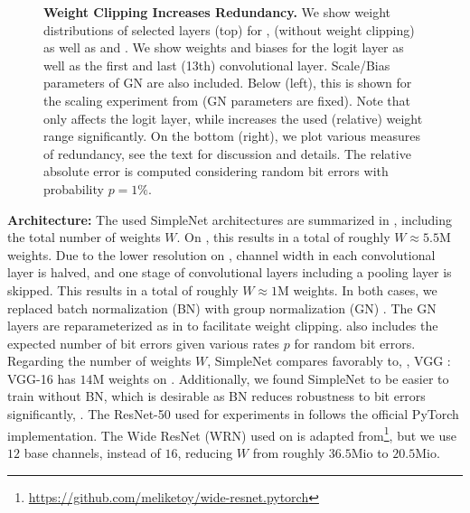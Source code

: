\begin{figure}[t]
\begin{subfigure}{0.35\textwidth}
	\end{subfigure}
	\vspace*{-6px}
	\caption{\textbf{Weight Clipping Increases Redundancy.} We show weight distributions of selected layers (top) for \Quant, \Random (without weight clipping) as well as \Clipping[$0.1$] and \Clipping[$0.05$]. We show weights and biases for the logit layer as well as the first and last (13th) convolutional layer. Scale/Bias parameters of GN are also included. Below (left), this is shown for the scaling experiment from  (GN parameters are fixed). Note that \Random only affects the logit layer, while \Clipping increases the used (relative) weight range significantly. On the bottom (right), we plot various measures of redundancy, see the text for discussion and details. The relative absolute error is computed considering random bit errors with probability $p = 1\%$.}
	\label{fig:supp-clipping}
	\vspace*{-0.1cm}
\end{figure}

\textbf{Architecture:} The used SimpleNet architectures \cite{HasanpourARXIV2016} are summarized in , including the total number of weights $W$. On \Cifar, this results in a total of roughly $W \approx 5.5\text{M}$ weights. Due to the lower resolution on \MNIST, channel width in each convolutional layer is halved, and one stage of convolutional layers including a pooling layer is skipped. This results in a total of roughly $W \approx 1\text{M}$ weights. In both cases, we replaced batch normalization (BN) \cite{IoffeICML2015} with group normalization (GN) \cite{WuECCV2018}. The GN layers are reparameterized as in  to facilitate weight clipping.  also includes the expected number of bit errors given various rates $p$ for random bit errors. Regarding the number of weights $W$, SimpleNet compares favorably to, \eg, VGG \cite{SimonyanICLR2015}: VGG-16 has $14\text{M}$ weights on \Cifar. Additionally, we found SimpleNet to be easier to train without BN, which is desirable as BN reduces robustness to bit errors significantly, \cf {}. The ResNet-50 \cite{HeCVPR2016} used for experiments in  follows the official PyTorch \cite{PaszkeNIPSWORK2017} implementation. The Wide ResNet (WRN) \cite{ZagoruykoBMVC2016} used on \CifarH is adapted from\footnote{\url{https://github.com/meliketoy/wide-resnet.pytorch}}, but we use $12$ base channels, instead of $16$, reducing $W$ from roughly $36.5\text{Mio}$ to $20.5\text{Mio}$.

